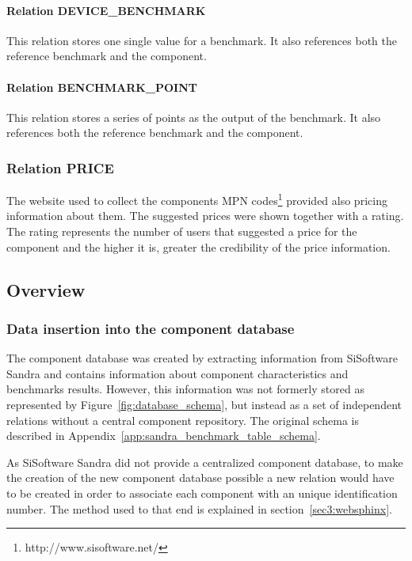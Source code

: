         \paragraph*{Relation DEVICE\_BENCHMARK}
            This relation stores one single value for a benchmark. It also references both the reference benchmark and the component.
            
        \paragraph*{Relation BENCHMARK\_POINT}
            This relation stores a series of points as the output of the benchmark. It also references both the reference benchmark and the component.            

    \subsubsection*{Relation PRICE}
        The website used to collect the components MPN codes\footnote{http://www.sisoftware.net/} provided also pricing information about them. The suggested prices were shown together with a rating. The rating represents the number of users that suggested a price for the component and the higher it is, greater the credibility of the price information.
                        
\subsection{Overview} \label{sec4:analysis_overview}
    \subsubsection*{Data insertion into the component database}
        The component database was created by extracting information from SiSoftware Sandra and contains information about component characteristics and benchmarks results. However, this information was not formerly stored as represented by Figure~\ref{fig:database_schema}, but instead as a set of independent relations without a central component repository. The original schema is described in Appendix~\ref{app:sandra_benchmark_table_schema}.
    
        As SiSoftware Sandra did not provide a centralized component database, to make the creation of the new component database possible a new relation would have to be created in order to associate each component with an unique identification number. The method used to that end is explained in section~\ref{sec3:websphinx}.
    
